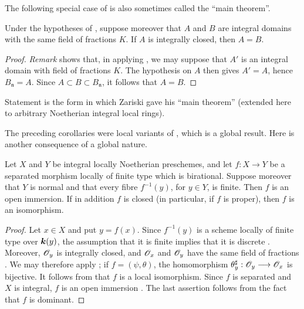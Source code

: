 The following special case of  is also sometimes
called the ``main theorem''.

\begin{corollary}[4.4.8]
\label{III.4.4.8}
Under the hypotheses of , suppose moreover that $A$
and $B$ are integral domains with the same field of fractions $K$.
If $A$ is integrally closed, then $A=B$.
\end{corollary}

\begin{proof}
\emph{Remark}  shows that, in applying
, we may suppose that $A'$ is an integral domain
with field of fractions $K$.  The hypothesis on $A$ then gives
$A'=A$, hence $B_{\mathfrak n}=A$.  Since
$A\subset B\subset B_{\mathfrak n}$, it follows that $A=B$.
\end{proof}

Statement  is the form in which Zariski gave his
``main theorem'' (extended here to arbitrary Noetherian integral
local rings).

The preceding corollaries were local variants of
, which is a global result.  Here is another
consequence of a global nature.

\begin{corollary}[4.4.9]
\label{III.4.4.9}
Let $X$ and $Y$ be integral locally Noetherian preschemes, and let
$f:X\to Y$ be a separated morphism locally of finite type which is
birational.  Suppose moreover that $Y$ is normal and that every
fibre $f^{-1}(y)$, for $y\in Y$, is finite.  Then $f$ is an open
immersion.  If in addition $f$ is closed (in particular, if $f$ is
proper), then $f$ is an isomorphism.
\end{corollary}

\begin{proof}
Let $x\in X$ and put $y=f(x)$.  Since $f^{-1}(y)$ is a scheme
locally of finite type over $\boldsymbol{k}(y)$, the assumption that it is finite implies
that it is discrete .  Moreover, $\mathscr{O}_y$ is
integrally closed, and $\mathscr{O}_x$ and $\mathscr{O}_y$ have the same field
of fractions .  We may therefore apply
; if $f=(\psi,\theta)$, the homomorphism $\theta_y^\sharp:\mathscr{O}_y\longrightarrow\mathscr{O}_x$
is bijective.  It follows from  that $f$ is a local
isomorphism.  Since $f$ is separated and $X$ is integral, $f$ is an
open immersion .  The last assertion follows from
the fact that $f$ is dominant.
\end{proof}


